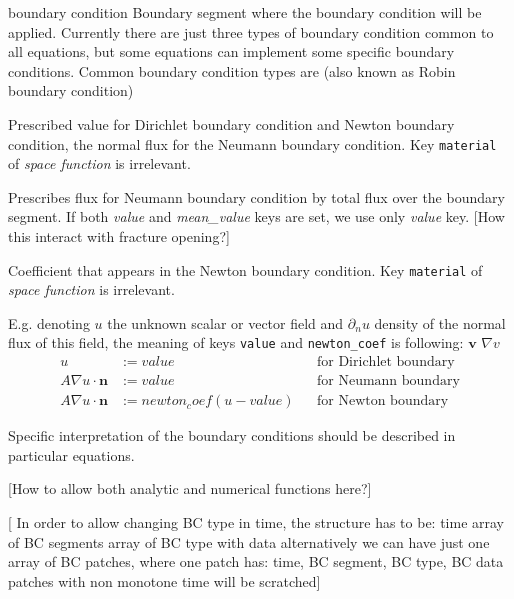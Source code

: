 \documentclass[12pt,a4paper]{report}
\def\prtl{\partial}
\def\vc#1{\mathbf{\boldsymbol{#1}}}     %
\def\grad{\nabla}
\begin{document}
\begin{recordtype}{boundary condition}{}
  Boundary segment where the boundary condition will be applied.
  Currently there are just three types of boundary condition common to all equations, 
  but some equations can implement some specific boundary conditions. Common boundary condition  types are
   (also known as Robin boundary condition)


Prescribed value for Dirichlet boundary condition and Newton boundary condition, the normal flux for the Neumann boundary condition.
Key \verb'material' of {\it space function} is irrelevant.

Prescribes flux for Neumann boundary condition by total flux over the boundary segment. If both {\it value} and {\it mean\_value} keys
are set, we use only {\it value} key. 
[How this interact with fracture opening?]


Coefficient that appears in the Newton boundary condition. Key \verb'material' of {\it space function} is irrelevant.
\end{recordtype}

E.g. denoting $u$ the unknown scalar or vector field and $\prtl_n u$ density of the normal flux of this field,
the meaning of keys \verb'value' and \verb'newton_coef' is following:
$\vc{v}$ $\grad v$
\begin{align*}
 u &:= value &&\text{for Dirichlet boundary} \\
 A\grad u \cdot \vc{n} &:= value && \text{for Neumann  boundary} \\
A\grad u \cdot \vc{n} &:= newton_coef ( u - value ) && \text{for Newton boundary}
\end{align*}

Specific interpretation of the boundary conditions should be described in particular equations.

[How to allow both analytic  and numerical functions here?]

[ In order to allow changing BC type in time, the structure has to be: time array of BC segments array of BC type with data
alternatively we can have just one array of BC patches, where one patch has: time, BC segment, BC type, BC data
patches with non monotone time will be scratched]
\end{document}
